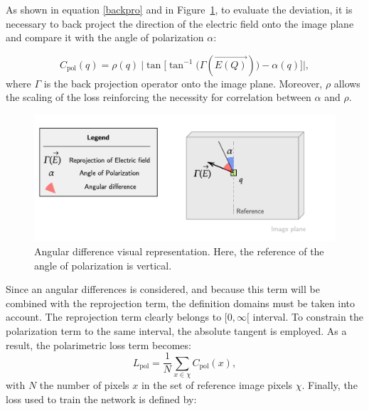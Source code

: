 As shown in equation \ref{backpro} and in Figure~\ref{fig:cpol}, to evaluate the deviation, it is necessary to back project the direction of the electric field onto the image plane and compare it with the angle of polarization $\alpha$:

\begin{equation}\label{backpro}
C_{\textrm{pol}}(q) = \rho(q) ~ \Big|\tan\big[\tan^{-1}\Big(\Gamma(\overrightarrow{E(Q)})\Big) - \alpha(q)\big]\Big| ,
\end{equation}
where $\Gamma$ is the back projection operator onto the image plane. 
Moreover, $\rho$ allows the scaling of the loss reinforcing the necessity for correlation between $\alpha$ and $\rho$.\\
\begin{figure}[]
	\centering
	\includegraphics[keepaspectratio,width=\linewidth]{Figures/ECCV/Cpol}
	\caption{Angular difference visual representation. Here, the reference of the angle of polarization is vertical.}
	\label{fig:cpol}
\end{figure}


Since an angular differences is considered, and because this term will be combined with the reprojection term, the definition domains must be taken into account. The reprojection term clearly belongs to $[0,\infty[$ interval. To constrain the polarization term to the same interval, the absolute tangent is employed.
As a result, the polarimetric loss term becomes:
\begin{equation}\label{LPol}
L_{\textrm{pol}} = \frac{1}{N}\sum_{x \in \chi} C_{\textrm{pol}}(x),
\end{equation}
with $N$ the number of pixels $x$ in the set of reference image pixels $\chi$. Finally, the loss used to train the network is defined by: 

